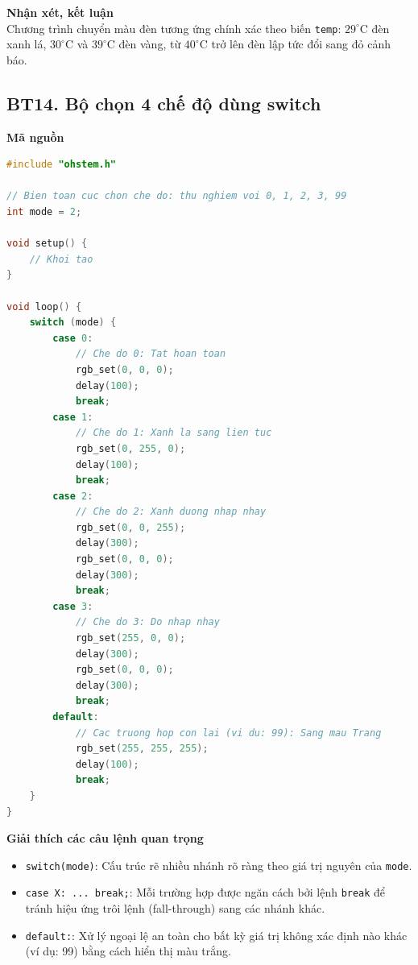 \noindent\textbf{Nhận xét, kết luận}\\
Chương trình chuyển màu đèn tương ứng chính xác theo biến \texttt{temp}: $29^\circ\text{C}$ đèn xanh lá, $30^\circ\text{C}$ và $39^\circ\text{C}$ đèn vàng, từ $40^\circ\text{C}$ trở lên đèn lập tức đổi sang đỏ cảnh báo.


\subsection*{BT14. Bộ chọn 4 chế độ dùng switch}

\noindent\textbf{Mã nguồn}\\
\begin{lstlisting}[language=C]
#include "ohstem.h"

// Bien toan cuc chon che do: thu nghiem voi 0, 1, 2, 3, 99
int mode = 2; 

void setup() {
    // Khoi tao
}

void loop() {
    switch (mode) {
        case 0:
            // Che do 0: Tat hoan toan
            rgb_set(0, 0, 0);
            delay(100);
            break;
        case 1:
            // Che do 1: Xanh la sang lien tuc
            rgb_set(0, 255, 0);
            delay(100);
            break;
        case 2:
            // Che do 2: Xanh duong nhap nhay
            rgb_set(0, 0, 255);
            delay(300);
            rgb_set(0, 0, 0);
            delay(300);
            break;
        case 3:
            // Che do 3: Do nhap nhay
            rgb_set(255, 0, 0);
            delay(300);
            rgb_set(0, 0, 0);
            delay(300);
            break;
        default:
            // Cac truong hop con lai (vi du: 99): Sang mau Trang
            rgb_set(255, 255, 255);
            delay(100);
            break;
    }
}
\end{lstlisting}

\noindent\textbf{Giải thích các câu lệnh quan trọng}\\
\begin{itemize}
    \item \texttt{switch(mode)}: Cấu trúc rẽ nhiều nhánh rõ ràng theo giá trị nguyên của \texttt{mode}.
    \item \texttt{case X: ... break;}: Mỗi trường hợp được ngăn cách bởi lệnh \texttt{break} để tránh hiệu ứng trôi lệnh (fall-through) sang các nhánh khác.
    \item \texttt{default:}: Xử lý ngoại lệ an toàn cho bất kỳ giá trị không xác định nào khác (ví dụ: 99) bằng cách hiển thị màu trắng.
\end{itemize}

